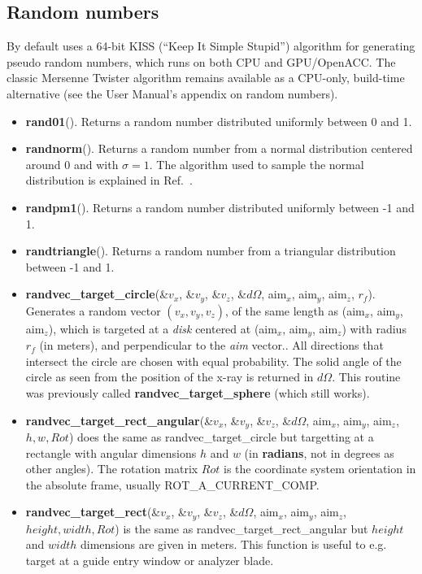 \subsection{Random numbers}
By default \MCX uses a 64-bit KISS (``Keep It Simple Stupid'') algorithm for generating pseudo random numbers, which runs on both CPU and GPU/OpenACC. The classic Mersenne Twister\cite{matsumoto1998mersenne} algorithm remains available as a CPU-only, build-time alternative (see the User Manual's appendix on random numbers).
\begin{itemize}
\item {\bfseries rand01}(). Returns a random number distributed uniformly between 0 and 1.
\item {\bfseries randnorm}(). Returns a random number from a normal
  distribution centered around 0 and with $\sigma=1$. The algorithm used to
  sample the normal distribution is explained in Ref.~\cite[ch.7]{num_rep}.
\item {\bfseries randpm1}(). Returns a random number distributed uniformly between -1 and 1.
\item {\bfseries randtriangle}(). Returns a random number from a triangular distribution between -1 and 1.
\item {\bfseries randvec\_target\_circle}(\&$v_x$, \&$v_y$, \&$v_z$, \&$d\Omega$,
  aim$_x$, aim$_y$, aim$_z$, $r_f$). Generates a random vector $(v_x, v_y,
  v_z)$, of the same length as (aim$_x$, aim$_y$, aim$_z$), which is
  targeted at a \emph{disk} centered at (aim$_x$, aim$_y$, aim$_z$) with
  radius $r_f$ (in meters), and perpendicular to the \emph{aim} vector.. All directions
  that intersect the circle are chosen with equal probability. The solid
  angle of the circle as seen from the position of the x-ray is returned
  in $d\Omega$. This routine was previously called {\bfseries randvec\_target\_sphere}
  (which still works).
\item {\bfseries randvec\_target\_rect\_angular}(\&$v_x$, \&$v_y$, \&$v_z$,
  \&$d\Omega$, aim$_x$, aim$_y$, aim$_z$,$h, w, Rot$) does the same as
  randvec\_target\_circle but targetting at a rectangle with angular dimensions
  $h$ and $w$ (in {\bfseries radians}, not in degrees as other angles). The
  rotation matrix $Rot$ is the coordinate system orientation in the absolute
  frame, usually ROT\_A\_CURRENT\_COMP.
\item {\bfseries randvec\_target\_rect}(\&$v_x$, \&$v_y$, \&$v_z$,
  \&$d\Omega$, aim$_x$, aim$_y$, aim$_z$,$height, width, Rot$) is the same as
  randvec\_target\_rect\_angular but $height$ and $width$ dimensions are given
  in meters. This function is useful to e.g. target at a guide entry window
  or analyzer blade.
\end{itemize}

